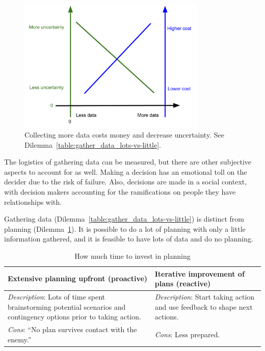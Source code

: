 \begin{figure}[ht]
        \centering
        \includegraphics[width=0.8\textwidth]{images/cost_and_uncertainty_for_data_collection}
        \caption{Collecting more data costs money and decrease uncertainty. See Dilemma~\ref{table:gather_data_lots-vs-little}.}
        \label{fig:data_collection_cost_uncertainty}
\end{figure}

The logistics of gathering data can be measured, but there are other subjective aspects to account for as well. Making a decision has an emotional toll on the decider due to the risk of failure. Also, decisions are made in a social context, with decision makers accounting for the ramifications on people they have relationships with. 


Gathering data (Dilemma~\ref{table:gather_data_lots-vs-little}) is distinct from planning (Dilemma~\ref{table:planning}). It is possible to do a lot of planning with only a little information gathered, and it is feasible to have lots of data and do no planning. 

\begin{center}
\begin{table}[ht]
\begin{tabular}{ | m{\dilemmatablewidth}| m{\dilemmatablewidth} | } 
  \hline
  \textbf{Extensive planning upfront (proactive)} & 
  \textbf{Iterative improvement of plans (reactive)} \\ 
  \hline
  \textit{Description}: Lots of time spent brainstorming potential scenarios and contingency options prior to taking action. & 
  \textit{Description}: Start taking action and use feedback to shape next actions. \\ 
  \hline
  \textit{Cons}: ``No plan survives contact with the enemy.'' & 
  \textit{Cons}: Less prepared. \\  
  \hline
\end{tabular}
\caption{How much time to invest in planning
}
\label{table:planning}
\end{table}
\end{center}

